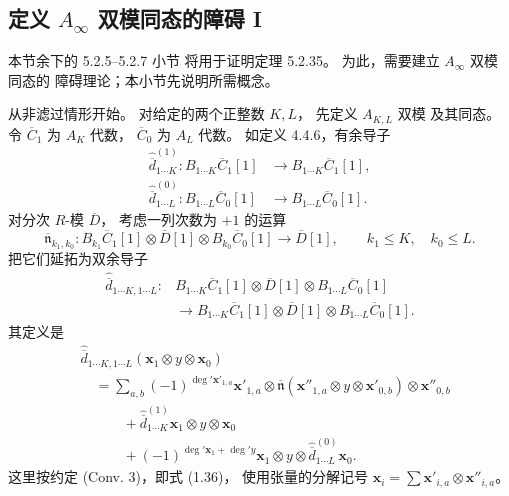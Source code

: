 
\subsection{定义 $A_\infty$ 双模同态的障碍 I}
\label{subsec:5-2-5}

本节余下的 5.2.5--5.2.7 小节
将用于证明定理 5.2.35。
为此，需要建立 $A_\infty$ 双模同态的
障碍理论；本小节先说明所需概念。

从非滤过情形开始。
对给定的两个正整数 $K,L$，
先定义 $A_{K,L}$ 双模
及其同态。
令 $\overline C_1$ 为 $A_K$ 代数，
$\overline C_0$ 为 $A_L$ 代数。
如定义 4.4.6，有余导子
\[
\begin{aligned}
\widehat{\overline d}^{(1)}_{1\cdots K}:
B_{1\cdots K}\overline C_1[1]
&\longrightarrow
B_{1\cdots K}\overline C_1[1],\\
\widehat{\overline d}^{(0)}_{1\cdots L}:
B_{1\cdots L}\overline C_0[1]
&\longrightarrow
B_{1\cdots L}\overline C_0[1].
\end{aligned}
\]
对分次 $R$-模 $\overline D$，
考虑一列次数为 $+1$ 的运算
\[
\overline{\mathfrak n}_{k_1,k_0}:
B_{k_1}\overline C_1[1]
\otimes\overline D[1]
\otimes B_{k_0}\overline C_0[1]
\longrightarrow\overline D[1],
\qquad k_1\leq K,\quad k_0\leq L.
\]
把它们延拓为双余导子
\[
\begin{aligned}
\widehat{\overline d}_{1\cdots K,1\cdots L}:
&B_{1\cdots K}\overline C_1[1]
\otimes\overline D[1]
\otimes B_{1\cdots L}\overline C_0[1]\\
&\longrightarrow
B_{1\cdots K}\overline C_1[1]
\otimes\overline D[1]
\otimes B_{1\cdots L}\overline C_0[1].
\end{aligned}
\]
其定义是
\[
\begin{aligned}
&\widehat{\overline d}_{1\cdots K,1\cdots L}
(\mathbf x_1\otimes y\otimes\mathbf x_0)\\
&\quad=
\sum_{a,b}(-1)^{\deg'\mathbf x'_{1,a}}
\mathbf x'_{1,a}\otimes
\overline{\mathfrak n}
(\mathbf x''_{1,a}\otimes y\otimes
 \mathbf x'_{0,b})
\otimes\mathbf x''_{0,b}\\
&\qquad\quad+
\widehat{\overline d}^{(1)}_{1\cdots K}
\mathbf x_1\otimes y\otimes\mathbf x_0\\
&\qquad\quad+
(-1)^{\deg'\mathbf x_1+\deg' y}
\mathbf x_1\otimes y\otimes
\widehat{\overline d}^{(0)}_{1\cdots L}
\mathbf x_0.
\end{aligned}
\]
这里按约定 (Conv. 3)，即式 (1.36)，
使用张量的分解记号
$\mathbf x_i
=\sum\mathbf x'_{i,a}\otimes
\mathbf x''_{i,a}$。

